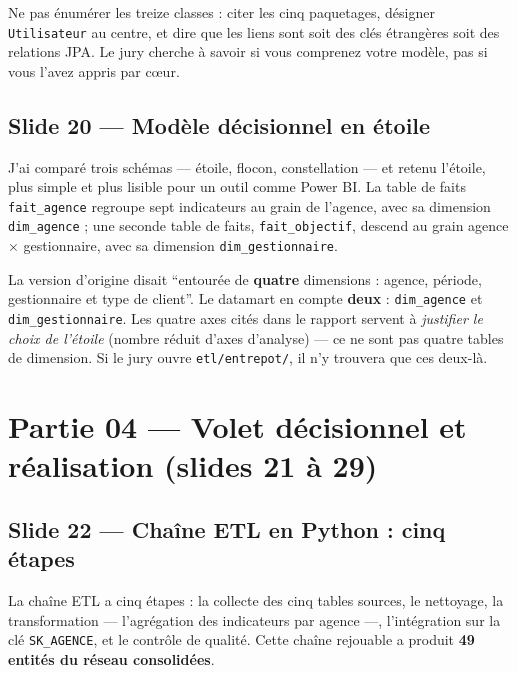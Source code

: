 \documentclass[a4paper,11pt]{article}
\begin{document}
\begin{note}
\small Ne pas énumérer les treize classes : citer les cinq paquetages, désigner
\texttt{Utilisateur} au centre, et dire que les liens sont soit des clés
étrangères soit des relations JPA. Le jury cherche à savoir si vous comprenez
votre modèle, pas si vous l'avez appris par c\oe{}ur.
\end{note}

\subsection*{Slide 20 --- Modèle décisionnel en étoile}

J'ai comparé trois schémas --- étoile, flocon, constellation --- et retenu
l'étoile, plus simple et plus lisible pour un outil comme Power BI. La table de
faits \texttt{fait\_agence} regroupe sept indicateurs au grain de l'agence, avec
sa dimension \texttt{dim\_agence} ; une seconde table de faits,
\texttt{fait\_objectif}, descend au grain agence $\times$ gestionnaire, avec sa
dimension \texttt{dim\_gestionnaire}.

\begin{corrige}
La version d'origine disait \enquote{entourée de \textbf{quatre} dimensions :
agence, période, gestionnaire et type de client}. Le datamart en compte
\textbf{deux} : \texttt{dim\_agence} et \texttt{dim\_gestionnaire}. Les quatre
axes cités dans le rapport servent à \emph{justifier le choix de l'étoile}
(nombre réduit d'axes d'analyse) --- ce ne sont pas quatre tables de dimension.
Si le jury ouvre \texttt{etl/entrepot/}, il n'y trouvera que ces deux-là.
\end{corrige}

\section*{Partie 04 --- Volet décisionnel et réalisation (slides 21 à 29)}


\subsection*{Slide 22 --- Chaîne ETL en Python : cinq étapes}

La chaîne ETL a cinq étapes : la collecte des cinq tables sources, le nettoyage,
la transformation --- l'agrégation des indicateurs par agence ---, l'intégration
sur la clé \texttt{SK\_AGENCE}, et le contrôle de qualité. Cette chaîne
rejouable a produit \textbf{49 entités du réseau consolidées}.
\end{document}
